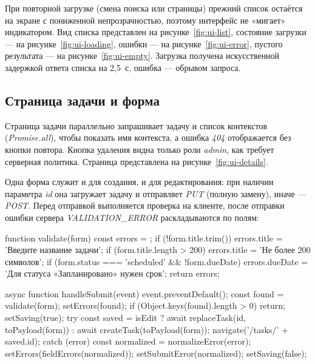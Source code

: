 \documentclass{stp}
\newcommand{\en}[1]{\textit{#1}}
\begin{document}
При повторной загрузке (смена поиска или страницы) прежний список остаётся на
экране с пониженной непрозрачностью, поэтому интерфейс не «мигает» индикатором.
Вид списка представлен на рисунке~\ref{fig:ui-list}, состояние загрузки --- на
рисунке~\ref{fig:ui-loading}, ошибки --- на рисунке~\ref{fig:ui-error},
пустого результата --- на рисунке~\ref{fig:ui-empty}. Загрузка получена
искусственной задержкой ответа списка на 2,5~с, ошибка --- обрывом запроса.





\subsection{Страница задачи и форма}

Страница задачи параллельно запрашивает задачу и список контекстов
(\en{Promise.all}), чтобы показать имя контекста, а ошибка \en{404}
отображается без кнопки повтора. Кнопка удаления видна только роли
\en{admin}, как требует серверная политика. Страница представлена на
рисунке~\ref{fig:ui-details}.


Одна форма служит и для создания, и для редактирования: при наличии
параметра \en{id} она загружает задачу и отправляет \en{PUT} (полную замену),
иначе --- \en{POST}. Перед отправкой выполняется проверка на клиенте, после
отправки ошибки сервера \en{VALIDATION\_ERROR} раскладываются по полям:

\begin{stplisting}
function validate(form) {
  const errors = {};
  if (!form.title.trim()) errors.title = 'Введите название задачи';
  if (form.title.length > 200) {
    errors.title = 'Не более 200 символов';
  }
  if (form.status === 'scheduled' && !form.dueDate) {
    errors.dueDate = 'Для статуса «Запланировано» нужен срок';
  }
  return errors;
}

async function handleSubmit(event) {
  event.preventDefault();
  const found = validate(form);
  setErrors(found);
  if (Object.keys(found).length > 0) return;
  setSaving(true);
  try {
    const saved = isEdit
      ? await replaceTask(id, toPayload(form))
      : await createTask(toPayload(form));
    navigate('/tasks/' + saved.id);
  } catch (error) {
    const normalized = normalizeError(error);
    setErrors(fieldErrors(normalized));
    setSubmitError(normalized);
    setSaving(false);
  }
}
\end{stplisting}
\end{document}
